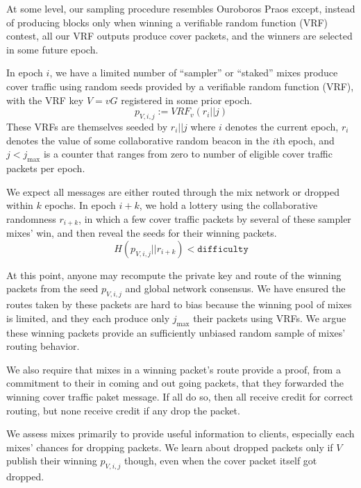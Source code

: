 ﻿\documentclass{sig-alternate-hotpets}
\begin{document}
At some level, our sampling procedure resembles Ouroboros Praos \cite{OuroborosPraos} except, instead of producing blocks only when winning a verifiable random function (VRF) contest, all our VRF outputs produce cover packets, and the winners are selected in some future epoch.  

\smallskip

In epoch $i$, we have a limited number of ``sampler'' or ``staked''
mixes produce cover traffic using random seeds provided by a verifiable
random function (VRF), with the VRF key $V = v G$ registered in some
prior epoch.
$$ p_{V,i,j} := VRF_v(r_i || j) $$
These VRFs are themselves seeded by $r_i || j$ where $i$ denotes the
current epoch, $r_i$ denotes the value of some collaborative random
beacon in the $i$th epoch, and $j < j_{\max}$ is a counter that ranges
from zero to number of eligible cover traffic packets per epoch.

We expect all messages are either routed through the mix network or
dropped within $k$ epochs.  In epoch $i+k$, we hold a lottery using
the collaborative randomness $r_{i+k}$, in which a few cover traffic
packets by several of these sampler mixes’ win, and then reveal the
seeds for their winning packets. 
$$ H(p_{V,i,j} || r_{i+k}) < \mathtt{difficulty} $$

At this point, anyone may recompute the private key and route of the
winning packets from the seed $p_{V,i,j}$ and global network consensus.
We have ensured the routes taken by these packets are hard to bias
because the winning pool of mixes is limited, and they each produce
only $j_{\max}$ their packets using VRFs.  
We argue these winning packets provide an sufficiently unbiased random
sample of mixes' routing behavior.

We also require that mixes in a winning packet's route provide a proof, from a commitment to their in coming and out going packets, that they forwarded the winning cover traffic paket message.  
If all do so, then all receive credit for correct routing, but none receive credit if any drop the packet.

\smallskip

We assess mixes primarily to provide useful information to clients,
especially each mixes' chances for dropping packets.
We learn about dropped packets only if $V$ publish their winning
$p_{V,i,j}$ though, even when the cover packet itself got dropped.  
\end{document}
